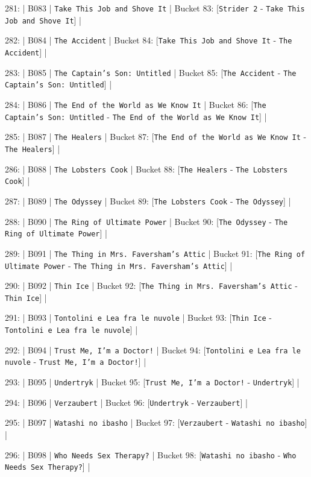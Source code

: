 \documentclass[11pt,a4paper]{article}
\begin{document}
{281: | B083 | \texttt{Take This Job and Shove It} | Bucket 83: [\texttt{Strider 2} - \texttt{Take This Job and Shove It}] |

282: | B084 | \texttt{The Accident} | Bucket 84: [\texttt{Take This Job and Shove It} - \texttt{The Accident}] |

283: | B085 | \texttt{The Captain's Son: Untitled} | Bucket 85: [\texttt{The Accident} - \texttt{The Captain's Son: Untitled}] |

284: | B086 | \texttt{The End of the World as We Know It} | Bucket 86: [\texttt{The Captain's Son: Untitled} - \texttt{The End of the World as We Know It}] |

285: | B087 | \texttt{The Healers} | Bucket 87: [\texttt{The End of the World as We Know It} - \texttt{The Healers}] |

286: | B088 | \texttt{The Lobsters Cook} | Bucket 88: [\texttt{The Healers} - \texttt{The Lobsters Cook}] |

287: | B089 | \texttt{The Odyssey} | Bucket 89: [\texttt{The Lobsters Cook} - \texttt{The Odyssey}] |

288: | B090 | \texttt{The Ring of Ultimate Power} | Bucket 90: [\texttt{The Odyssey} - \texttt{The Ring of Ultimate Power}] |

289: | B091 | \texttt{The Thing in Mrs. Faversham's Attic} | Bucket 91: [\texttt{The Ring of Ultimate Power} - \texttt{The Thing in Mrs. Faversham's Attic}] |

290: | B092 | \texttt{Thin Ice} | Bucket 92: [\texttt{The Thing in Mrs. Faversham's Attic} - \texttt{Thin Ice}] |

291: | B093 | \texttt{Tontolini e Lea fra le nuvole} | Bucket 93: [\texttt{Thin Ice} - \texttt{Tontolini e Lea fra le nuvole}] |

292: | B094 | \texttt{Trust Me, I'm a Doctor!} | Bucket 94: [\texttt{Tontolini e Lea fra le nuvole} - \texttt{Trust Me, I'm a Doctor!}] |

293: | B095 | \texttt{Undertryk} | Bucket 95: [\texttt{Trust Me, I'm a Doctor!} - \texttt{Undertryk}] |

294: | B096 | \texttt{Verzaubert} | Bucket 96: [\texttt{Undertryk} - \texttt{Verzaubert}] |

295: | B097 | \texttt{Watashi no ibasho} | Bucket 97: [\texttt{Verzaubert} - \texttt{Watashi no ibasho}] |

296: | B098 | \texttt{Who Needs Sex Therapy?} | Bucket 98: [\texttt{Watashi no ibasho} - \texttt{Who Needs Sex Therapy?}] |

}
\end{document}
